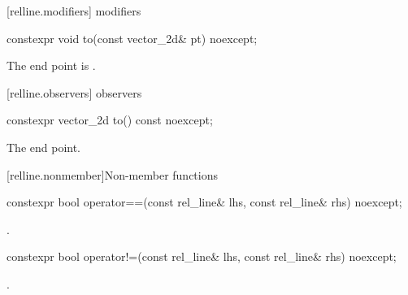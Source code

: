  [relline.modifiers]{ modifiers}%

\begin{itemdecl}
constexpr void to(const vector_2d& pt) noexcept;
\end{itemdecl}
\begin{itemdescr}
\pnum
\effects
The end point is .
\end{itemdescr}

 [relline.observers]{ observers}%

%
\begin{itemdecl}
constexpr vector_2d to() const noexcept;
\end{itemdecl}
\begin{itemdescr}
\pnum
\returns
The end point.
\end{itemdescr}

 [relline.nonmember]{Non-member functions}%

%
\begin{itemdecl}
constexpr bool operator==(const rel_line& lhs, const rel_line& rhs) noexcept;
\end{itemdecl}
\begin{itemdescr}
\pnum
\returns
{}.
\end{itemdescr}

%
\begin{itemdecl}
constexpr bool operator!=(const rel_line& lhs, const rel_line& rhs) noexcept;
\end{itemdecl}
\begin{itemdescr}
\pnum
\returns
{}.
\end{itemdescr}
